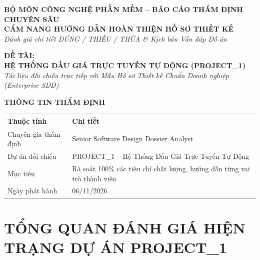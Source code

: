\documentclass[11pt,a4paper]{article}
\begin{document}

\begin{center}
    {\large \textbf{BỘ MÔN CÔNG NGHỆ PHẦN MỀM -- BÁO CÁO THẨM ĐỊNH CHUYÊN SÂU}}\\[0.2cm]
    {\LARGE \textbf{CẨM NANG HƯỚNG DẪN HOÀN THIỆN HỒ SƠ THIẾT KẾ}}\\[0.15cm]
    {\normalsize \textit{Đánh giá chi tiết ĐÚNG / THIẾU / THỪA \& Kịch bản Vấn đáp Đồ án}}\\[0.4cm]
    
    \begin{tcolorbox}[colback=darkblue,colframe=warningred,arc=3mm,width=0.98\textwidth]
        \centering \color{white}
        \vspace{0.2cm}
        {\large \textbf{ĐỀ TÀI:}}\\[0.15cm]
        {\huge \textbf{HỆ THỐNG ĐẤU GIÁ TRỰC TUYẾN TỰ ĐỘNG (PROJECT\_1)}}\\[0.2cm]
        {\small \textit{Tài liệu đối chiếu trực tiếp với Mẫu Hồ sơ Thiết kế Chuẩn Doanh nghiệp (Enterprise SDD)}}
        \vspace{0.2cm}
    \end{tcolorbox}
\end{center}

\vspace{0.3cm}

\noindent \textbf{\large THÔNG TIN THẨM ĐỊNH}
\begin{table}[H]
    \centering
    \small
    \begin{tabularx}{\textwidth}{|l|X|}
        \hline
        \textbf{Thuộc tính} & \textbf{Chi tiết} \\ \hline
        Chuyên gia thẩm định & Senior Software Design Dossier Analyst \\ \hline
        Dự án đối chiếu & PROJECT\_1 -- Hệ Thống Đấu Giá Trực Tuyến Tự Động \\ \hline
        Mục tiêu & Rà soát 100\% các tiêu chí chất lượng, hướng dẫn từng vai trò thành viên \\ \hline
        Ngày phát hành & 06/11/2026 \\ \hline
    \end{tabularx}
\end{table}

\newpage
\tableofcontents
\newpage

\section{TỔNG QUAN ĐÁNH GIÁ HIỆN TRẠNG DỰ ÁN PROJECT\_1}
\end{document}
